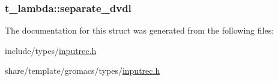 \hypertarget{structt__lambda_abd91ceacca7006aded7bdef3184f3ddf}{
\subsubsection[{separate\-\_\-dvdl}]{ {\bf t\-\_\-lambda\-::separate\-\_\-dvdl}}}\label{structt__lambda_abd91ceacca7006aded7bdef3184f3ddf}


\-The documentation for this struct was generated from the following files\-:\begin{DoxyCompactItemize}
\item 
include/types/\hyperlink{include_2types_2inputrec_8h}{inputrec.\-h}\item 
share/template/gromacs/types/\hyperlink{share_2template_2gromacs_2types_2inputrec_8h}{inputrec.\-h}\end{DoxyCompactItemize}

